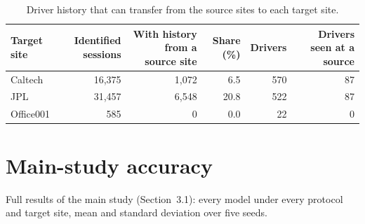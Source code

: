 \begin{table}[H]\centering\footnotesize
\caption{Driver history that can transfer from the source sites to each target site.}\label{tab:s-xsite}
\begin{tabular}{lrrrrr}\toprule
Target site & Identified sessions & With history from a source site & Share (\%) & Drivers & Drivers seen at a source \\\midrule
Caltech & 16,375 & 1,072 & 6.5 & 570 & 87 \\
JPL & 31,457 & 6,548 & 20.8 & 522 & 87 \\
Office001 & 585 & 0 & 0.0 & 22 & 0 \\
\bottomrule\end{tabular}\end{table}

\section{Main-study accuracy}
Full results of the main study (Section~3.1): every model under every protocol and target site, mean and standard deviation over five seeds.
